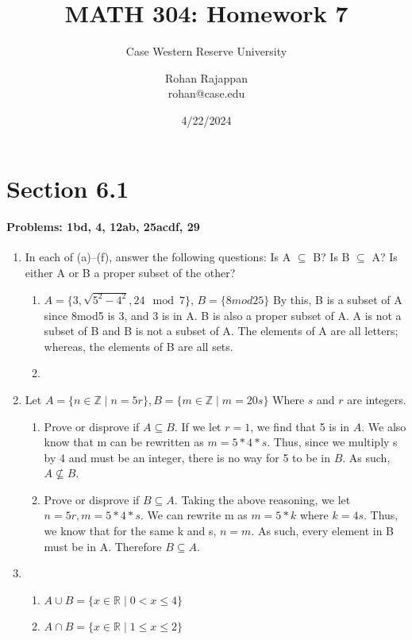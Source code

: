 \documentclass{article}
\title{MATH 304: Homework 7}
\subtitle{Case Western Reserve University}
\author{Rohan Rajappan \\rohan@case.edu}
\date{4/22/2024}
\makeatletter
\newcommand\setItemnumber[1]{\setcounter{enum\romannumeral\@enumdepth}{\numexpr#1-1\relax}}
\makeatother
\begin{document}
\maketitle

\section{Section 6.1}
\paragraph{Problems: 1bd, 4, 12ab, 25acdf, 29}
\begin{enumerate}
    \item In each of (a)–(f), answer the following questions: Is A $\subseteq$ B? Is B $\subseteq$ A? Is either A or B a proper subset of the other?
    \begin{enumerate}
        \setItemnumber{2}
        \item $A=\{3,\sqrt{5^2-4^2},24\mod{7}\}$, $B = \{8mod25\}$
        By this, B is a subset of A since 8mod5 is 3, and 3 is in A. B is also a proper subset of A.
        \setItemnumber{4} A is not a subset of B and B is not a subset of A. The elements of A are all letters; whereas, the elements of B are all sets.
        \item 
    \end{enumerate}
    \setItemnumber{4}
    \item Let $A = \{n\in\mathbb{Z} \mid n=5r\}, B=\{m\in\mathbb{Z}\mid m=20s\}$ Where $s$ and $r$ are integers.
    \begin{enumerate}
        \item Prove or disprove if $A\subseteq B$. If we let $r=1$, we find that 5 is in $A$. We also know that m can be rewritten as $m=5*4*s$. Thus, since we multiply s by 4 and must be an integer, there is no way for 5 to be in $B$. As such, $A\nsubseteq B$.
        \item Prove or disprove if $B\subseteq A$. Taking the above reasoning, we let $n=5r, m=5*4*s$. We can rewrite m as $m=5*k$ where $k=4s$. Thus, we know that for the same k and s, $n=m$. As such, every element in B must be in A. Therefore $B\subseteq A$.
    \end{enumerate}
    \setItemnumber{12}
    \item 
    \begin{enumerate}
        \item $A\cup B = \{x\in\mathbb{R} \mid 0<x\leq4\}$
        \item $A\cap B = \{x\in\mathbb{R} \mid 1\leq x\leq2\}$

\end{enumerate}
\end{enumerate}
\end{document}
